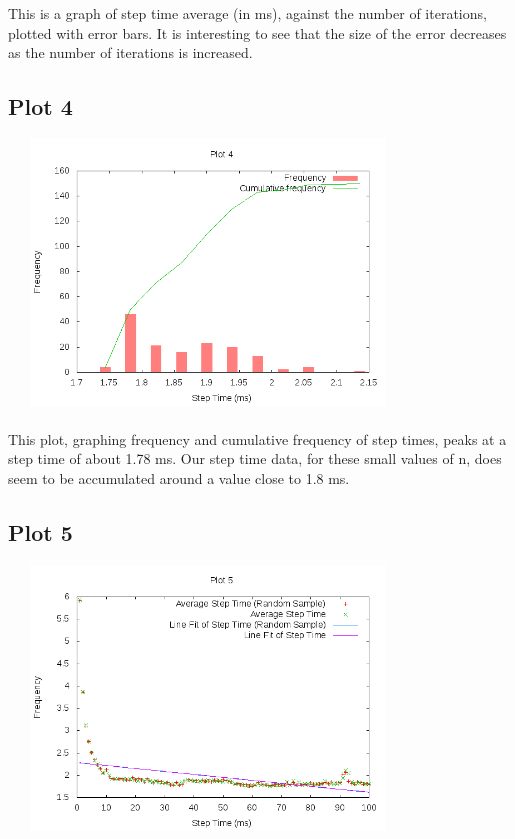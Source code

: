 \documentclass[11pt]{article}
\begin{document}
	This is a graph of step time average (in ms), against the number of iterations, plotted with error bars. It is interesting to see that the size of the error decreases as the number of iterations is increased.

\subsection{Plot 4}

	\includegraphics[width=300pt, height=200pt]{../plots/plot4.png}\\\\

	This plot, graphing frequency and cumulative frequency of step times, peaks at a step time of about 1.78 ms. Our step time data, for these small values of n, does seem to be accumulated around a value close to 1.8 ms.

\subsection{Plot 5}

	\includegraphics[width=300pt, height=200pt]{../plots/plot5.png}\\\\
\end{document}
